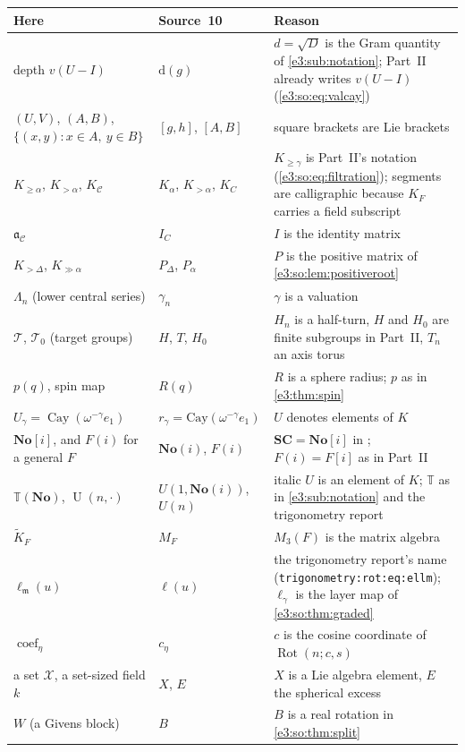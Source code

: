 \documentclass[11pt,letterpaper]{article}
\numberwithin{equation}{section}
\theoremstyle{definition}
\theoremstyle{remark}
\newcommand{\No}{\mathbf{No}}
\newcommand{\TT}{\mathbb T}
\newcommand{\mm}{\mathfrak m}
\newcommand{\cay}{\operatorname{Cay}}
\newcommand{\Rot}{\operatorname{Rot}}
\newcommand{\comm}[2]{\left(#1,#2\right)}
\newcommand{\Un}{\operatorname{U}}
\newcommand{\coef}{\operatorname{coef}}
\newcommand{\commset}[2]{\{\comm{x}{y}:x\in #1,\ y\in #2\}}
\begin{document}
\begin{center}\small
\begin{longtable}{L{0.27\textwidth}L{0.25\textwidth}L{0.38\textwidth}}
\toprule
Here & Source~10 & Reason\\
\midrule
\endhead
depth $v(U-I)$ & $\mathrm d(g)$ & $d=\sqrt D$ is the Gram quantity of
\cref{e3:sub:notation}; Part~II already writes $v(U-I)$
(\cref{e3:so:eq:valcay})\\
$\comm UV$, $\comm AB$, $\commset AB$ & $[g,h]$, $[A,B]$ & square brackets are
Lie brackets\\
$K_{\ge\alpha}$, $K_{>\alpha}$, $K_{\mathcal C}$ & $K_\alpha$, $K_{>\alpha}$,
$K_C$ & $K_{\ge\gamma}$ is Part~II's notation (\cref{e3:so:eq:filtration});
segments are calligraphic because $K_F$ carries a field subscript\\
$\mathfrak a_{\mathcal C}$ & $I_C$ & $I$ is the identity matrix\\
$K_{>\Delta}$, $K_{\gg\alpha}$ & $P_\Delta$, $P_\alpha$ & $P$ is the positive
matrix of \cref{e3:so:lem:positiveroot}\\
$\Lambda_n$ (lower central series) & $\gamma_n$ & $\gamma$ is a valuation\\
$\mathcal T$, $\mathcal T_0$ (target groups) & $H$, $T$, $H_0$ & $H_n$ is a
half-turn, $H$ and $H_0$ are finite subgroups in Part~II, $T_n$ an axis
torus\\
$p(q)$, spin map & $R(q)$ & $R$ is a sphere radius; $p$ as in
\cref{e3:thm:spin}\\
$U_\gamma=\cay(\omega^{-\gamma}e_1)$ & $r_\gamma=\mathrm{Cay}(\omega^{-\gamma}e_1)$ &
$U$ denotes elements of $K$\\
$\No[i]$, and $F(i)$ for a general $F$ & $\No(i)$, $F(i)$ &
$\mathbf{SC}=\No[i]$ in ; $F(i)=F[i]$ as in Part~II\\
$\TT(\No)$, $\Un(n,\cdot)$ & $U(1,\No(i))$, $U(n)$ & italic $U$ is an element
of $K$; $\TT$ as in \cref{e3:sub:notation} and the trigonometry report\\
$\widetilde K_F$ & $M_F$ & $M_3(F)$ is the matrix algebra\\
$\ell_{\mm}(u)$ & $\ell(u)$ & the trigonometry report's name
(\texttt{trigonometry:rot:eq:ellm}); $\ell_\gamma$ is the layer map of
\cref{e3:so:thm:graded}\\
$\coef_\eta$ & $c_\eta$ & $c$ is the cosine coordinate of $\Rot(n;c,s)$\\
a set $\mathcal X$, a set-sized field $k$ & $X$, $E$ & $X$ is a Lie algebra
element, $E$ the spherical excess\\
$W$ (a Givens block) & $B$ & $B$ is a real rotation in \cref{e3:so:thm:split}\\
\bottomrule
\end{longtable}
\end{center}
\end{document}
